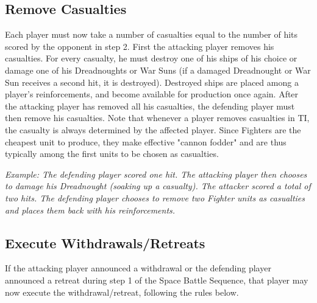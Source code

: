 \documentclass[11pt,fleqn]{book} %
\begin{document}
\subsection{Remove Casualties}
Each player must now take a number of casualties equal to the number of hits scored by the opponent in step 2. First the attacking player removes his casualties. For every casualty, he must destroy one of his ships of his choice or damage one of his Dreadnoughts or War Suns (if a damaged Dreadnought or War Sun receives a second hit, it is destroyed). Destroyed ships are placed among a player's reinforcements, and become available for production once again. After the attacking player has removed all his casualties, the defending player must then remove his casualties.
Note that whenever a player removes casualties in TI, the casualty is always determined by the affected player. Since Fighters are the cheapest unit to produce, they make effective "cannon fodder" and are thus typically among the first units to be chosen as casualties.

\emph{Example: The defending player scored one hit. The attacking player then chooses to damage his Dreadnought (soaking up a casualty). The attacker scored a total of two hits. The defending player chooses to remove two Fighter units as casualties and places them back with his reinforcements.}

\subsection{Execute Withdrawals/Retreats}
If the attacking player announced a withdrawal or the defending player announced a retreat during step 1 of the Space Battle Sequence, that player may now execute the withdrawal/retreat, following the rules below.
\end{document}
